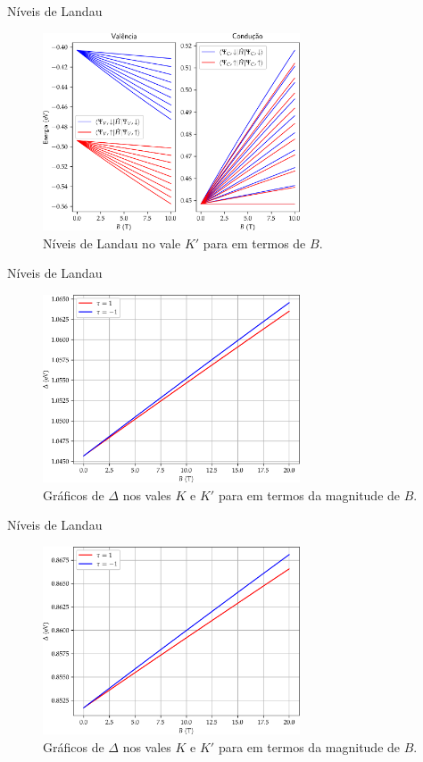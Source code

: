 \begin{frame}{Níveis de Landau}
  \begin{figure}
    \centering
    \includegraphics[width=0.68\textwidth]{imagens/crse2_k_prime_valley_landau_levels.png}
    \caption{Níveis de Landau no vale $K'$ para  em termos de $B$.}
  \end{figure}
\end{frame}

\begin{frame}{Níveis de Landau}
  \begin{figure}
    \centering
    \includegraphics[width=0.68\textwidth]{imagens/crs2_bandgap_field.png}
    \caption{
      Gráficos de $\Delta$ nos vales $K$ e $K'$ para  em termos da
      magnitude de $B$.
    }
  \end{figure}
\end{frame}

\begin{frame}{Níveis de Landau}
  \begin{figure}
    \centering
    \includegraphics[width=0.68\textwidth]{imagens/crse2_bandgap_field.png}
    \caption{
      Gráficos de $\Delta$ nos vales $K$ e $K'$ para  em termos da
      magnitude de $B$.
    }
  \end{figure}
\end{frame}

